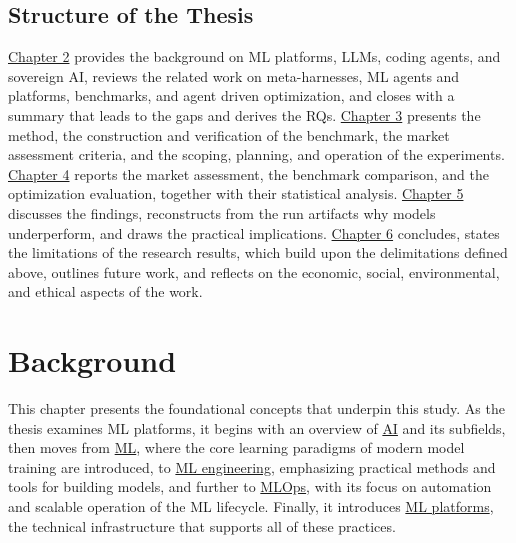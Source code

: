 \documentclass[
english,                 %
bibtex,                  %
]{kththesis}
\numberwithin{listing}{chapter}
\begin{document}
\section{Structure of the Thesis}
\label{sec:intro_structure_of_the_thesis}
\glsresetall

\hyperref[ch:background]{Chapter 2} provides the background on \gls{ML} platforms, \glspl{LLM}, coding agents, and sovereign \gls{AI}, reviews the related work on meta-harnesses, \gls{ML} agents and platforms, benchmarks, and agent driven optimization, and closes with a summary that leads to the gaps and derives the \glspl{RQ}. \hyperref[ch:method]{Chapter 3} presents the method, the construction and verification of the benchmark, the market assessment criteria, and the scoping, planning, and operation of the experiments. \hyperref[ch:results_and_analysis]{Chapter 4} reports the market assessment, the benchmark comparison, and the optimization evaluation, together with their statistical analysis. \hyperref[ch:discussion]{Chapter 5} discusses the findings, reconstructs from the run artifacts why models underperform, and draws the practical implications. \hyperref[ch:conclusions_and_future_work]{Chapter 6} concludes, states the limitations of the research results, which build upon the delimitations defined above, outlines future work, and reflects on the economic, social, environmental, and ethical aspects of the work.

\cleardoublepage

\chapter{Background}
\label{ch:background}
\glsresetall

This chapter presents the foundational concepts that underpin this study. As the thesis examines \gls{ML} platforms, it begins with an overview of \hyperref[sec:bg_ai]{\gls{AI}} and its subfields, then moves from \hyperref[sec:bg_ml]{\gls{ML}}, where the core learning paradigms of modern model training are introduced, to \hyperref[sec:bg_mle]{\gls{ML} engineering}, emphasizing practical methods and tools for building models, and further to \hyperref[sec:bg_mlops]{\gls{MLOps}}, with its focus on automation and scalable operation of the \gls{ML} lifecycle. Finally, it introduces \hyperref[sec:bg_mlplat]{\gls{ML} platforms}, the technical infrastructure that supports all of these practices.
\end{document}
